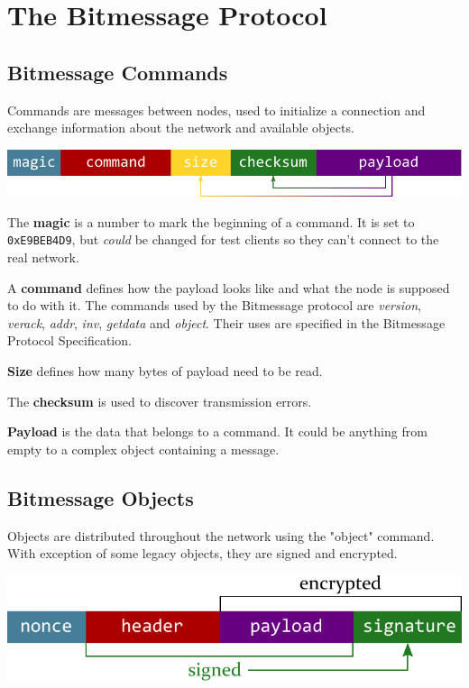 \documentclass{bfh}
\begin{document}
  \newpage
  \section{The Bitmessage Protocol}

  \subsection{Bitmessage Commands}

  Commands are messages between nodes, used to initialize a connection and exchange information about the network and available objects.

  \includegraphics[width=\textwidth]{images/command.pdf}

  The \textbf{magic} is a number to mark the beginning of a command. It is set to \texttt{0xE9BEB4D9}, but \textit{could} be changed for test clients so they can't connect to the real network.

  A \textbf{command} defines how the payload looks like and what the node is supposed to do with it. The commands used by the Bitmessage protocol are \textit{version}, \textit{verack}, \textit{addr}, \textit{inv}, \textit{getdata} and \textit{object}. Their uses are specified in the Bitmessage Protocol Specification.\cite{wiki:protocol}

  \textbf{Size} defines how many bytes of payload need to be read.

  The \textbf{checksum} is used to discover transmission errors.

  \textbf{Payload} is the data that belongs to a command. It could be anything from empty to a complex object containing a message.


  \subsection{Bitmessage Objects}
  Objects are distributed throughout the network using the "object" command. With exception of some legacy objects, they are signed and encrypted.

  \includegraphics[width=\textwidth]{images/object.pdf}
\end{document}
